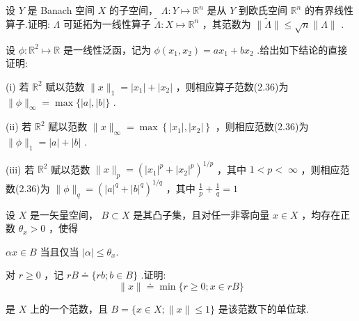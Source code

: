 \begin{rbhw}
设 $Y$ 是 Banach 空间 $X$ 的子空间， $\Lambda  : Y \mapsto  {\mathbb{R}}^{n}$ 是从 $Y$ 到欧氏空间 ${\mathbb{R}}^{n}$ 的有界线性算子.证明: $\Lambda$ 可延拓为一线性算子 $\widetilde{\Lambda } : X \mapsto  {\mathbb{R}}^{n}$ ，其范数为 $\| \widetilde{\Lambda }\|  \leq  \sqrt{n}\| \Lambda \|$ .
\end{rbhw}

\begin{rbhw}
设 $\phi  : {\mathbb{R}}^{2} \mapsto  \mathbb{R}$ 是一线性泛函，记为 $\phi \left( {{x}_{1},{x}_{2}}\right)  = a{x}_{1} + b{x}_{2}$ .给出如下结论的直接证明:

(i) 若 ${\mathbb{R}}^{2}$ 赋以范数 $\| x{\| }_{1} = \left| {x}_{1}\right|  + \left| {x}_{2}\right|$ ，则相应算子范数(2.36)为 $\| \phi {\| }_{\infty } = \max \{ \left| a\right| ,\left| b\right| \}$ .

(ii) 若 ${\mathbb{R}}^{2}$ 赋以范数 $\| x{\| }_{\infty } = \max \left\{  {\left| {x}_{1}\right| ,\left| {x}_{2}\right|  }\right\}$ ，则相应范数(2.36)为 $\| \phi {\| }_{1} = \left| a\right|  + \left| b\right|$ .

(iii) 若 ${\mathbb{R}}^{2}$ 赋以范数 $\| x{\| }_{p} = {\left( {\left| {x}_{1}\right| }^{p} + {\left| {x}_{2}\right| }^{p}\right) }^{1/p}$ ，其中 $1 < p < \; \infty$ ，则相应范数(2.36)为 $\| \phi {\| }_{q} = {\left( {\left| a\right| }^{q} + {\left| b\right| }^{q}\right) }^{1/q}$ ，其中 $\frac{1}{p} + \frac{1}{q} = 1$
\end{rbhw}

\begin{rbhw}
设 $X$ 是一矢量空间， $B \subset  X$ 是其凸子集，且对任一非零向量 $x \in  X$ ，均存在正数 ${\theta }_{x} > 0$ ，使得

${\alpha x} \in  B$ 当且仅当 $\left| \alpha \right|  \leq  {\theta }_{x}.$

对 $r \geq  0$ ，记 ${rB} \doteq  \{ {rb};b \in  B\}$ .证明:
\[
\| x\|  \doteq  \min \{ r \geq  0;x \in  {rB}\}
\]

是 $X$ 上的一个范数，且 $B = \{ x \in  X;\| x\|  \leq  1\}$ 是该范数下的单位球.
\end{rbhw}

